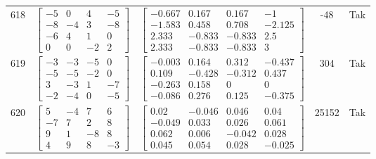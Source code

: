 \documentclass[a4paper,12pt]{article}
\begin{document}
\begin{tabular}{c c c c c}
618
&
$\begin{bmatrix} -5 & 0 & 4 & -5 \\ -8 & -4 & 3 & -8 \\ -6 & 4 & 1 & 0 \\ 0 & 0 & -2 & 2 \end{bmatrix}$
&
$\begin{bmatrix} -0.667 & 0.167 & 0.167 & -1 \\ -1.583 & 0.458 & 0.708 & -2.125 \\ 2.333 & -0.833 & -0.833 & 2.5 \\ 2.333 & -0.833 & -0.833 & 3 \end{bmatrix}$
&
-48
&
Tak
\\
619
&
$\begin{bmatrix} -3 & -3 & -5 & 0 \\ -5 & -5 & -2 & 0 \\ 3 & -3 & 1 & -7 \\ -2 & -4 & 0 & -5 \end{bmatrix}$
&
$\begin{bmatrix} -0.003 & 0.164 & 0.312 & -0.437 \\ 0.109 & -0.428 & -0.312 & 0.437 \\ -0.263 & 0.158 & 0 & 0 \\ -0.086 & 0.276 & 0.125 & -0.375 \end{bmatrix}$
&
304
&
Tak
\\
620
&
$\begin{bmatrix} 5 & -4 & 7 & 6 \\ -7 & 7 & 2 & 8 \\ 9 & 1 & -8 & 8 \\ 4 & 9 & 8 & -3 \end{bmatrix}$
&
$\begin{bmatrix} 0.02 & -0.046 & 0.046 & 0.04 \\ -0.049 & 0.033 & 0.026 & 0.061 \\ 0.062 & 0.006 & -0.042 & 0.028 \\ 0.045 & 0.054 & 0.028 & -0.025 \end{bmatrix}$
&
25152
&
Tak
\\
\end{tabular} \egroup \newpage
\end{document}
